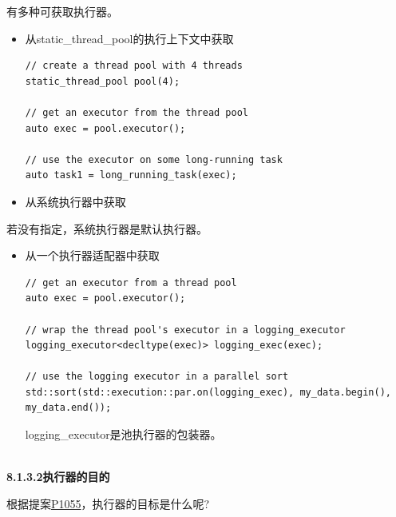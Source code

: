 有多种可获取执行器。

\begin{itemize}
\item 
从static\_thread\_pool的执行上下文中获取

\begin{lstlisting}[style=styleCXX]
// create a thread pool with 4 threads
static_thread_pool pool(4);

// get an executor from the thread pool
auto exec = pool.executor();

// use the executor on some long-running task
auto task1 = long_running_task(exec);
\end{lstlisting}

\item 
从系统执行器中获取
\end{itemize}

若没有指定，系统执行器是默认执行器。

\begin{itemize}
\item 
从一个执行器适配器中获取

\begin{lstlisting}[style=styleCXX]
// get an executor from a thread pool
auto exec = pool.executor();

// wrap the thread pool's executor in a logging_executor
logging_executor<decltype(exec)> logging_exec(exec);

// use the logging executor in a parallel sort
std::sort(std::execution::par.on(logging_exec), my_data.begin(), my_data.end());
\end{lstlisting}

logging\_executor是池执行器的包装器。
\end{itemize}

\hspace*{\fill} \\ %
\noindent
\textbf{8.1.3.2\hspace{0.2cm}执行器的目的}

根据提案\href{http://open-std.org/JTC1/SC22/WG21/docs/papers/2018/p1055r0.pdf}{P1055}，执行器的目标是什么呢?

